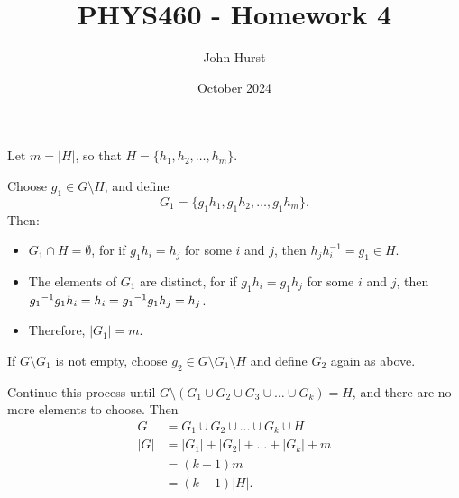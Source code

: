 \documentclass[12pt]{extarticle}
\title{PHYS460 - Homework 4}
\author{John Hurst}
\date{October 2024}
\begin{document}
\maketitle


Let $m=|H|$, so that $H = \{h_1, h_2, \ldots, h_m\}$.

Choose $g_1 \in G \setminus H$, and define
\[
G_1 = \{g_1h_1, g_1h_2, \ldots, g_1h_m\}.
\]
Then:
\begin{itemize}
\item $G_1 \cap H = \emptyset$, for if $g_1h_i = h_j$ for some $i$ and $j$, then $h_jh_i^{-1}= g_1 \in H$.
\item The elements of $G_1$ are distinct, for if $g_1h_i = g_1h_j$ for some $i$ and $j$, then ${{g_1}^{-1}}g_1h_i = h_i = {{g_1}^{-1}}g_1h_j = h_j$.
\item Therefore, $|G_1| = m$.
\end{itemize}

If $G\setminus G_1$ is not empty, choose $g_2 \in G\setminus G_1 \setminus H$ and define $G_2$ again as above.

Continue this process until $G \setminus (G_1 \cup G_2 \cup G_3 \cup \ldots \cup G_k) = H$, and there are no more elements to choose.
Then
\begin{align*}
G & = G_1 \cup G_2 \cup \ldots \cup G_k \cup H \\
|G| & = |G_1| + |G_2| + \ldots + |G_k| + m \\
& = (k+1)m \\
& = (k+1)|H|.
\end{align*}

\end{document}
